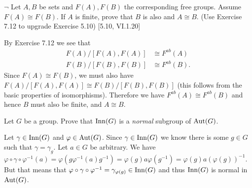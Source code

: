 \begin{problem}
	$\neg$ Let $A, B$ be sets and $F(A), F(B)$ the corresponding free groups. Assume $F(A) \cong F(B)$. If $A$ is finite, prove that $B$ is also and $A \cong B$. (Use Exercise 7.12 to upgrade Exercise 5.10) [5.10, VI.1.20]
\end{problem}

\begin{solution}
	By Exercise 7.12 we see that
	\begin{equation*}
		\begin{aligned}
			F(A)/[F(A), F(A)] &\cong F^{ab}(A) \\
			F(B)/[F(B), F(B)] &\cong F^{ab}(B) \text{.}
		\end{aligned}
	\end{equation*}
	Since $F(A) \cong F(B)$, we must also have $F(A)/[F(A), F(A)] \cong F(B)/[F(B), F(B)]$ (this follows from the basic properties of isomorphisms). Therefore we have $F^{ab}(A) \cong F^{ab}(B)$ and hence $B$ must also be finite, and $A \cong B$.
\end{solution}

\begin{problem}
	Let $G$ be a group. Prove that $\mathrm{Inn}(G)$ is a \emph{normal} subgroup of $\mathrm{Aut}(G)$.
\end{problem}

\begin{solution}
	Let $\gamma \in \mathrm{Inn}(G)$ and $\varphi \in \mathrm{Aut}(G)$. Since $\gamma \in \mathrm{Inn}(G)$ we know there is some $g \in G$ such that $\gamma = \gamma_g$. Let $a \in G$ be arbitrary. We have $\varphi \circ \gamma \circ \varphi^{-1}(a) = \varphi(g \varphi^{-1}(a) g^{-1}) = \varphi(g) a \varphi(g^{-1}) = \varphi(g) a (\varphi(g))^{-1}$. But that means that $\varphi \circ \gamma \circ \varphi^{-1} = \gamma_{\varphi(g)} \in \mathrm{Inn}(G)$ and thus $\mathrm{Inn}(G)$ is normal in $\mathrm{Aut}(G)$.
\end{solution}